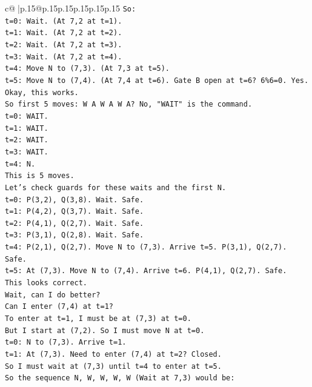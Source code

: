 \documentclass{article}
\begin{document}
{\begin{supertabular}{c@{$\;$}|p{.15\linewidth}@{}p{.15\linewidth}p{.15\linewidth}p{.15\linewidth}p{.15\linewidth}p{.15\linewidth}}
{{{\texttt{So:} \\
\texttt{t=0: Wait. (At 7,2 at t=1).} \\
\texttt{t=1: Wait. (At 7,2 at t=2).} \\
\texttt{t=2: Wait. (At 7,2 at t=3).} \\
\texttt{t=3: Wait. (At 7,2 at t=4).} \\
\texttt{t=4: Move N to (7,3). (At 7,3 at t=5).} \\
\texttt{t=5: Move N to (7,4). (At 7,4 at t=6). Gate B open at t=6? 6\%6=0. Yes.} \\
\texttt{Okay, this works.} \\
\texttt{So first 5 moves: W A W A W A? No, "WAIT" is the command.} \\
\texttt{t=0: WAIT.} \\
\texttt{t=1: WAIT.} \\
\texttt{t=2: WAIT.} \\
\texttt{t=3: WAIT.} \\
\texttt{t=4: N.} \\
\texttt{This is 5 moves.} \\
\texttt{Let's check guards for these waits and the first N.} \\
\texttt{t=0: P(3,2), Q(3,8). Wait. Safe.} \\
\texttt{t=1: P(4,2), Q(3,7). Wait. Safe.} \\
\texttt{t=2: P(4,1), Q(2,7). Wait. Safe.} \\
\texttt{t=3: P(3,1), Q(2,8). Wait. Safe.} \\
\texttt{t=4: P(2,1), Q(2,7). Move N to (7,3). Arrive t=5. P(3,1), Q(2,7). Safe.} \\
\texttt{t=5: At (7,3). Move N to (7,4). Arrive t=6. P(4,1), Q(2,7). Safe.} \\
\texttt{This looks correct.} \\
\texttt{Wait, can I do better?} \\
\texttt{Can I enter (7,4) at t=1?} \\
\texttt{To enter at t=1, I must be at (7,3) at t=0.} \\
\texttt{But I start at (7,2). So I must move N at t=0.} \\
\texttt{t=0: N to (7,3). Arrive t=1.} \\
\texttt{t=1: At (7,3). Need to enter (7,4) at t=2? Closed.} \\
\texttt{So I must wait at (7,3) until t=4 to enter at t=5.} \\
\texttt{So the sequence N, W, W, W, W (Wait at 7,3) would be:} \\
}}}
\end{supertabular}}
\end{document}
